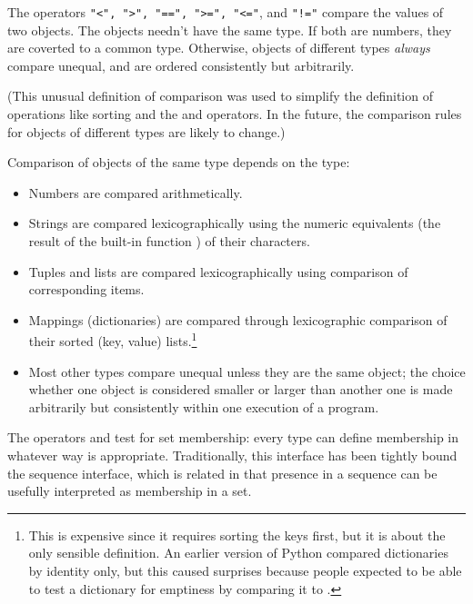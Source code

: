 The operators \texttt{"<", ">", "==", ">=", "<="}, and \texttt{"!="} compare
the values of two objects.  The objects needn't have the same type.
If both are numbers, they are coverted to a common type.  Otherwise,
objects of different types \emph{always} compare unequal, and are
ordered consistently but arbitrarily.

(This unusual definition of comparison was used to simplify the
definition of operations like sorting and the  and
 operators.  In the future, the comparison rules for
objects of different types are likely to change.)

Comparison of objects of the same type depends on the type:

\begin{itemize}

\item
Numbers are compared arithmetically.

\item
Strings are compared lexicographically using the numeric equivalents
(the result of the built-in function ) of their
characters.

\item
Tuples and lists are compared lexicographically using comparison of
corresponding items.

\item
Mappings (dictionaries) are compared through lexicographic
comparison of their sorted (key, value) lists.\footnote{
This is expensive since it requires sorting the keys first,
but it is about the only sensible definition.  An earlier version of
Python compared dictionaries by identity only, but this caused
surprises because people expected to be able to test a dictionary for
emptiness by comparing it to \code{\{\}}.}

\item
Most other types compare unequal unless they are the same object;
the choice whether one object is considered smaller or larger than
another one is made arbitrarily but consistently within one
execution of a program.

\end{itemize}

The operators  and  test for set
membership: every type can define membership in whatever way is
appropriate.  Traditionally, this interface has been tightly bound
the sequence interface, which is related in that presence in a sequence
can be usefully interpreted as membership in a set.

